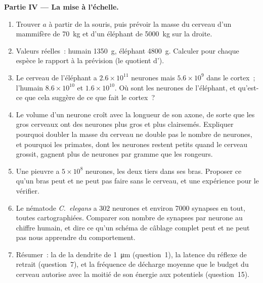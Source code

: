 \begin{problem}
\medskip
\noindent\textbf{Partie IV --- La mise à l'échelle.}
\begin{enumerate}[resume]
  \item Trouver $a$ à partir de la souris, puis prévoir la masse du
        cerveau d'un mammifère de \qty{70}{kg} et d'un éléphant de
        \qty{5000}{kg} sur la droite.
  \item Valeurs réelles~: humain \qty{1350}{g}, éléphant \qty{4800}{g}.
        Calculer pour chaque espèce le rapport à la prévision (le
        quotient d').
  \item Le cerveau de l'éléphant a $2.6\times 10^{11}$ neurones mais
        $5.6\times 10^{9}$ dans le cortex~; l'humain $8.6\times 10^{10}$
        et $1.6\times 10^{10}$. Où sont les neurones de l'éléphant, et
        qu'est-ce que cela suggère de ce que fait le cortex~?
  \item Le volume d'un neurone croît avec la longueur de son axone, de
        sorte que les gros cerveaux ont des neurones plus gros et plus
        clairsemés. Expliquer pourquoi doubler la masse du cerveau ne
        double pas le nombre de neurones, et pourquoi les primates, dont
        les neurones restent petits quand le cerveau grossit, gagnent
        plus de neurones par gramme que les rongeurs.
  \item Une pieuvre a $5\times 10^{8}$ neurones, les deux tiers dans ses
        bras. Proposer ce qu'un bras peut et ne peut pas faire sans le
        cerveau, et une expérience pour le vérifier.
  \item Le nématode \emph{C.~elegans} a $302$ neurones et environ
        \num{7000} synapses en tout, toutes cartographiées. Comparer son
        nombre de synapses par neurone au chiffre humain, et dire ce
        qu'un schéma de câblage complet peut et ne peut pas nous
        apprendre du comportement.
  \item Résumer~: la  de la dendrite de
        \qty{1}{\micro m} (question~1), la latence du réflexe de retrait
        (question~7), et la fréquence de décharge moyenne que le budget
        du cerveau autorise avec la moitié de son énergie aux potentiels
        (question~15).
\end{enumerate}
\end{problem}
